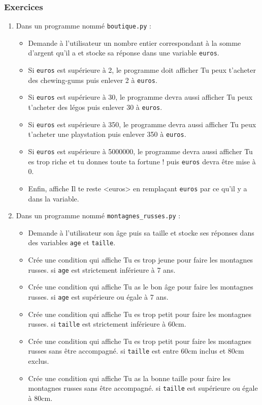 \documentclass[11pt]{article}
\begin{document}
\subsubsection*{Exercices}
\label{sec:orga3efe1f}
\begin{enumerate}
\item Dans un programme nommé \texttt{boutique.py} :
\begin{itemize}
\item Demande à l'utilisateur un nombre entier correspondant à la somme d'argent qu'il a et stocke sa réponse dans une variable \texttt{euros}.
\item Si \texttt{euros} est supérieure à 2, le programme doit afficher \og Tu peux t'acheter des chewing-gums\fg{} puis enlever 2 à \texttt{euros}.
\item Si \texttt{euros} est supérieure à 30, le programme devra aussi afficher \og Tu peux t'acheter des légos\fg{} puis enlever 30 à \texttt{euros}.
\item Si \texttt{euros} est supérieure à 350, le programme devra aussi afficher \og Tu peux t'acheter une playstation\fg{} puis enlever 350 à \texttt{euros}.
\item Si \texttt{euros} est supérieure à 5000000, le programme devra aussi afficher \og Tu es trop riche et tu donnes toute ta fortune !\fg{} puis \texttt{euros} devra être mise à 0.
\item Enfin, affiche \og Il te reste <euros>\fg{} en remplaçant \texttt{euros} par ce qu'il y a dans la variable.
\end{itemize}

\item Dans un programme nommé \texttt{montagnes\_russes.py} :
\begin{itemize}
\item Demande à l'utilisateur son âge puis sa taille et stocke ses réponses dans des variables \texttt{age} et \texttt{taille}.
\item Crée une condition qui affiche \og Tu es trop jeune pour faire les montagnes russes.\fg{} si \texttt{age} est strictement inférieure à 7 ans.
\item Crée une condition qui affiche \og Tu as le bon âge pour faire les montagnes russes.\fg{} si \texttt{age} est supérieure ou égale à 7 ans.
\item Crée une condition qui affiche \og Tu es trop petit pour faire les montagnes russes.\fg{} si \texttt{taille} est strictement inférieure à 60cm.
\item Crée une condition qui affiche \og Tu es trop petit pour faire les montagnes russes sans être accompagné.\fg{} si \texttt{taille} est entre 60cm inclus et 80cm exclus.
\item Crée une condition qui affiche \og Tu as la bonne taille pour faire les montagnes russes sans être accompagné.\fg{} si \texttt{taille} est supérieure ou égale à 80cm.
\end{itemize}


\end{enumerate}
\end{document}
